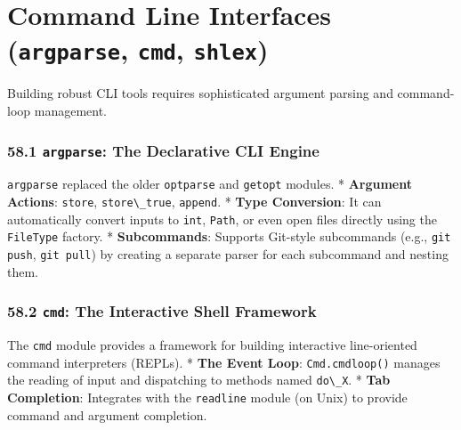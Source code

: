 \hypertarget{command-line-interfaces-argparse-cmd-shlex}{%
\chapter{\texorpdfstring{Command Line Interfaces (\texttt{argparse},
\texttt{cmd},
\texttt{shlex})}{Command Line Interfaces (argparse, cmd, shlex)}}\label{command-line-interfaces-argparse-cmd-shlex}}

Building robust CLI tools requires sophisticated argument parsing and
command-loop management.

\hypertarget{argparse-the-declarative-cli-engine}{%
\subsection{\texorpdfstring{58.1 \texttt{argparse}: The Declarative CLI
Engine}{58.1 argparse: The Declarative CLI Engine}}\label{argparse-the-declarative-cli-engine}}

\passthrough{\lstinline!argparse!} replaced the older
\passthrough{\lstinline!optparse!} and \passthrough{\lstinline!getopt!}
modules. * \textbf{Argument Actions}: \passthrough{\lstinline!store!},
\passthrough{\lstinline!store\_true!}, \passthrough{\lstinline!append!}.
* \textbf{Type Conversion}: It can automatically convert inputs to
\passthrough{\lstinline!int!}, \passthrough{\lstinline!Path!}, or even
open files directly using the \passthrough{\lstinline!FileType!}
factory. * \textbf{Subcommands}: Supports Git-style subcommands (e.g.,
\passthrough{\lstinline!git push!}, \passthrough{\lstinline!git pull!})
by creating a separate parser for each subcommand and nesting them.

\hypertarget{cmd-the-interactive-shell-framework}{%
\subsection{\texorpdfstring{58.2 \texttt{cmd}: The Interactive Shell
Framework}{58.2 cmd: The Interactive Shell Framework}}\label{cmd-the-interactive-shell-framework}}

The \passthrough{\lstinline!cmd!} module provides a framework for
building interactive line-oriented command interpreters (REPLs). *
\textbf{The Event Loop}: \passthrough{\lstinline!Cmd.cmdloop()!} manages
the reading of input and dispatching to methods named
\passthrough{\lstinline!do\_X!}. * \textbf{Tab Completion}: Integrates
with the \passthrough{\lstinline!readline!} module (on Unix) to provide
command and argument completion.

